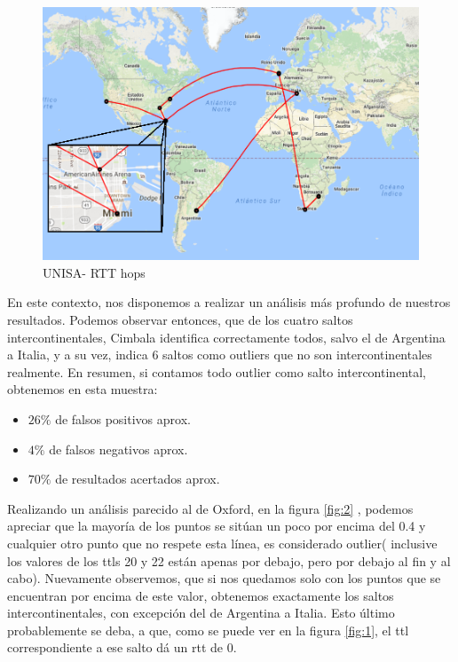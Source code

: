 \newpage

\begin{figure}[!htbp]
  \centering
    \includegraphics[scale=0.6]{imagenes/unisa-graficos/mapa-unisa.png}
  \caption{UNISA- RTT hops}
  \label{mapa-unisa}
\end{figure}

En este contexto, nos disponemos a realizar un análisis más profundo de nuestros resultados. Podemos observar entonces, que de los cuatro saltos intercontinentales, Cimbala identifica correctamente todos, salvo el de Argentina a Italia, y a su vez, indica 6 saltos como outliers que no son intercontinentales realmente. En resumen, si contamos todo outlier como salto intercontinental, obtenemos en esta muestra:

\begin{itemize}
	\item $26 \% $ de falsos positivos aprox.
	\item $4 \%$ de falsos negativos aprox.
	\item $70 \%$ de resultados acertados aprox.
\end{itemize}

Realizando un análisis parecido al de Oxford, en la figura \ref{fig:2} , podemos apreciar que la mayoría de los puntos se sitúan un poco por encima del 0.4 y cualquier otro punto que no respete esta línea, es considerado outlier( inclusive los valores de los ttls 20 y 22 están apenas por debajo, pero por debajo al fin y al cabo). Nuevamente observemos, que si nos quedamos solo con los puntos que se encuentran por encima de este valor, obtenemos exactamente los saltos intercontinentales, con excepción del de Argentina a Italia. Esto último probablemente se deba, a que, como se puede ver en la figura \ref{fig:1}, el ttl correspondiente a ese salto dá un rtt de 0.

